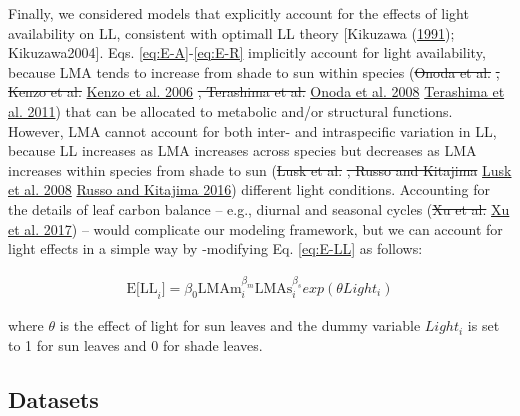 \documentclass[
  12pt,
]{article}
\providecommand{\DIFaddtex}[1]{{\protect\color{blue}\uwave{#1}}} %
\providecommand{\DIFdeltex}[1]{{\protect\color{red}\sout{#1}}}                      %
\providecommand{\DIFaddbegin}{} %
\providecommand{\DIFaddend}{} %
\providecommand{\DIFdelbegin}{} %
\providecommand{\DIFdelend}{} %
\providecommand{\DIFadd}[1]{\texorpdfstring{\DIFaddtex{#1}}{#1}} %
\providecommand{\DIFdel}[1]{\texorpdfstring{\DIFdeltex{#1}}{}} %
\newcommand{\DIFscaledelfig}{0.5}
\newlength{\DIFdelgraphicswidth} %
\newlength{\DIFdelgraphicsheight} %
\newcommand{\DIFaddincludegraphics}[2][]{{\color{blue}\fbox{\DIFOincludegraphics[#1]{#2}}}} %
\newcommand{\DIFdelincludegraphics}[2][]{%
\sbox{\DIFdelgraphicsbox}{\DIFOincludegraphics[#1]{#2}}%
\settoboxwidth{\DIFdelgraphicswidth}{\DIFdelgraphicsbox} %
\settoboxtotalheight{\DIFdelgraphicsheight}{\DIFdelgraphicsbox} %
\scalebox{\DIFscaledelfig}{%
\parbox[b]{\DIFdelgraphicswidth}{\usebox{\DIFdelgraphicsbox}\\[-\baselineskip] \rule{\DIFdelgraphicswidth}{0em}}\llap{\resizebox{\DIFdelgraphicswidth}{\DIFdelgraphicsheight}{%
\setlength{\unitlength}{\DIFdelgraphicswidth}%
\begin{picture}(1,1)%
\thicklines\linethickness{2pt} %
{\color[rgb]{1,0,0}\put(0,0){\framebox(1,1){}}}%
{\color[rgb]{1,0,0}\put(0,0){\line( 1,1){1}}}%
{\color[rgb]{1,0,0}\put(0,1){\line(1,-1){1}}}%
\end{picture}%
}\hspace*{3pt}}} %
} %
\DeclareRobustCommand{\DIFaddbegin}{\DIFOaddbegin \let\includegraphics\DIFaddincludegraphics} %
\DeclareRobustCommand{\DIFaddend}{\DIFOaddend \let\includegraphics\DIFOincludegraphics} %
\DeclareRobustCommand{\DIFdelbegin}{\DIFOdelbegin \let\includegraphics\DIFdelincludegraphics} %
\DeclareRobustCommand{\DIFdelend}{\DIFOaddend \let\includegraphics\DIFOincludegraphics} %
\begin{document}
Finally, we considered models that explicitly account for the effects of light availability on LL, consistent with optimall LL theory {[}Kikuzawa (\protect\hyperlink{ref-Kikuzawa1991}{1991}); Kikuzawa2004{]}.
Eqs. \eqref{eq:E-A}-\eqref{eq:E-R} implicitly account for light availability, because LMA tends to increase from shade to sun within species (\DIFdelbegin \DIFdel{Onoda et al. }\DIFdelend \protect\DIFdelbegin %
\DIFdel{, Kenzo et al. }\DIFdelend \DIFaddbegin \hyperlink{ref-Kenzo2006}{Kenzo et al. 2006}\DIFadd{, }\DIFaddend \protect\DIFdelbegin %
\DIFdel{, Terashima et al. }\DIFdelend \DIFaddbegin \hyperlink{ref-Onoda2008}{Onoda et al. 2008}\DIFadd{, }\DIFaddend \protect\DIFdelbegin %
\DIFdelend \DIFaddbegin \hyperlink{ref-Terashima2011}{Terashima et al. 2011}\DIFaddend ) that can be allocated to metabolic and/or structural functions.
However, LMA cannot account for both inter- and intraspecific variation in LL, because LL increases as LMA increases across species but decreases as LMA increases within species from shade to sun (\DIFdelbegin \DIFdel{Lusk et al. }\DIFdelend \protect\DIFdelbegin %
\DIFdel{, Russo and Kitajima }\DIFdelend \DIFaddbegin \hyperlink{ref-Lusk2008}{Lusk et al. 2008}\DIFadd{, }\DIFaddend \protect\DIFdelbegin %
\DIFdelend \DIFaddbegin \hyperlink{ref-Russo2016}{Russo and Kitajima 2016}\DIFaddend ) different light conditions.
Accounting for the details of leaf carbon balance -- e.g., diurnal and seasonal cycles (\DIFdelbegin \DIFdel{Xu et al. }\DIFdelend \protect\DIFdelbegin %
\DIFdelend \DIFaddbegin \hyperlink{ref-Xu2017}{Xu et al. 2017}\DIFaddend ) -- would complicate our modeling framework, but we can account for light effects in a simple way by -modifying Eq. \eqref{eq:E-LL} as follows:

\begin{align}
\mathrm{E[LL}_i] = \beta_0\mathrm{LMAm}_{i}^{\beta_m} \mathrm{LMAs}_{i}^{\beta_s} exp(\theta Light_i) \label{eq:E-LL2}
\end{align}

where \(\theta\) is the effect of light for sun leaves and the dummy variable \(Light_i\) is set to 1 for sun leaves and 0 for shade leaves.

\hypertarget{datasets}{%
\subsection{Datasets}\label{datasets}}
\end{document}
